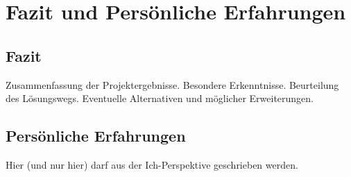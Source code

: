 



\chapter{Fazit und Persönliche Erfahrungen}


\section{Fazit}

Zusammenfassung der Projektergebnisse. 
Besondere Erkenntnisse. Beurteilung des Lösungswegs. Eventuelle Alternativen und möglicher Erweiterungen.

\section{Persönliche Erfahrungen}

Hier (und nur hier) darf aus der Ich-Perspektive geschrieben werden.